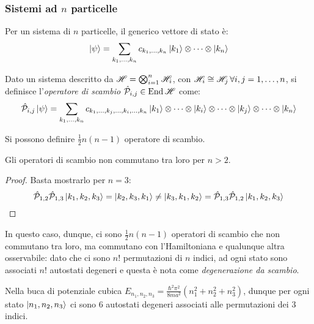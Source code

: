 \subsubsection{Sistemi ad $ n $ particelle}

Per un sistema di $ n $ particelle, il generico vettore di stato è:
\begin{equation}
	\ket{\psi} = \sum_{k_1, \dots, k_n} c_{k_1, \dots, k_n} \ket{k_1} \otimes \dots \otimes \ket{k_n}
	\label{eq:6.4}
\end{equation}

\begin{definition}
Dato un sistema descritto da $ \mathscr{H} = \bigotimes_{i = 1}^n \mathscr{H}_i $, con $ \mathscr{H}_i \cong \mathscr{H}_j \,\forall i,j = 1, \dots, n $, si definisce l'\textit{operatore di scambio} $ \hat{\mathcal{P}}_{i,j} \in \operatorname{End}{\mathscr{H}} $ come:
\begin{equation}
	\hat{\mathcal{P}}_{i,j} \ket{\psi} = \sum_{k_1, \dots, k_n} c_{k_1, \dots, k_j, \dots, k_i, \dots, k_n} \ket{k_1} \otimes \dots \otimes \ket{k_i} \otimes \dots \otimes \ket{k_j} \otimes \dots \otimes \ket{k_n}
	\label{eq:6.5}
\end{equation}
\end{definition}

\begin{proposition}
	Si possono definire $ \frac{1}{2} n (n - 1) $ operatore di scambio.
\end{proposition}

\begin{proposition}
	Gli operatori di scambio non commutano tra loro per $ n > 2 $.
\end{proposition}
\begin{proof}
	Basta mostrarlo per $ n = 3 $:
	\begin{equation*}
		\hat{\mathcal{P}}_{1,2} \hat{\mathcal{P}}_{1,3} \ket{k_1, k_2, k_3} = \ket{k_2, k_3, k_1} \neq \ket{k_3, k_1, k_2} = \hat{\mathcal{P}}_{1,3} \hat{\mathcal{P}}_{1,2} \ket{k_1, k_2, k_3}
	\end{equation*}
\end{proof}

In questo caso, dunque, ci sono $ \frac{1}{2} n (n-1) $ operatori di scambio che non commutano tra loro, ma commutano con l'Hamiltoniana e qualunque altra osservabile: dato che ci sono $ n! $ permutazioni di $ n $ indici, ad ogni stato sono associati $ n! $ autostati degeneri e questa è nota come \textit{degenerazione da scambio}.

\begin{example}
	Nella buca di potenziale cubica $ E_{n_1, n_2, n_3} = \frac{\hbar^2 \pi^2}{8 m a^2} \left( n_1^2 + n_2^2 + n_3^2 \right) $, dunque per ogni stato $ \ket{n_1, n_2, n_3} $ ci sono 6 autostati degeneri associati alle permutazioni dei 3 indici.
\end{example}

